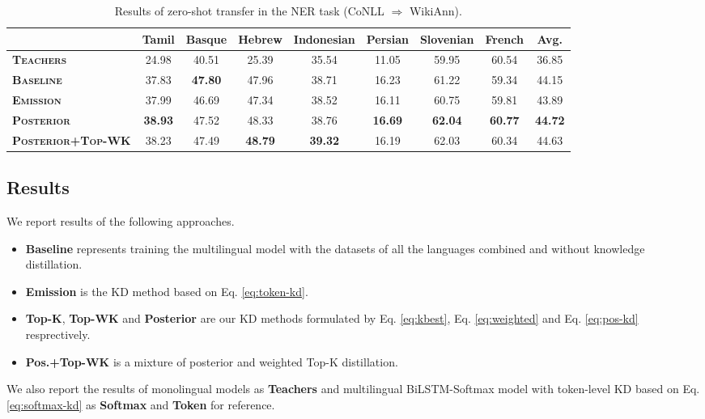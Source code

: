 \documentclass[11pt,a4paper]{article}
\begin{document}
\begin{table*}[ht]
\centering
\small
\begin{tabular}{l|ccccccc|c}
\hline\hline
 & \bf Tamil & \bf Basque    & \bf Hebrew    & \bf Indonesian & \bf Persian   & \bf Slovenian    & \bf French      & \bf Avg.   \\
\hline
\bf \textsc{Teachers}&          24.98&  40.51&  25.39&  35.54&  11.05&  59.95&  60.54&  36.85  \\
\bf \textsc{Baseline}         & 37.83 & \textbf{47.80} & 47.96 & 38.71 & 16.23 & 61.22 & 59.34 & 44.15 \\
\bf \textsc{Emission}        & 37.99 & 46.69 & 47.34 & 38.52 & 16.11 & 60.75 & 59.81 & 43.89 \\
\bf \textsc{Posterior}        & \textbf{38.93} & 47.52 & 48.33 & 38.76 & \textbf{16.69} & \textbf{62.04} & \textbf{60.77} & \textbf{44.72} \\
\bf \textsc{Posterior+Top-WK} & 38.23 & 47.49 & \textbf{48.79} & \textbf{39.32} & 16.19 & 62.03 & 60.34 & 44.63 \\
\hline\hline
\end{tabular}
\caption{Results of zero-shot transfer in the NER task (CoNLL $\Rightarrow$ WikiAnn).}
\label{tab:zeroshot}
\end{table*}

\subsection{Results}
\label{sec:result}
We report results of the following approaches.
\begin{itemize}
\item {\bf Baseline} represents training the multilingual model with the datasets of all the languages combined and without knowledge distillation.
    \item {\bf Emission} is the KD method based on Eq. \ref{eq:token-kd}.
    \item {\bf Top-K}, {\bf Top-WK} and {\bf Posterior} are our KD methods formulated by Eq. \ref{eq:kbest}, Eq. \ref{eq:weighted} and Eq. \ref{eq:pos-kd} resprectively. \item {\bf Pos.+Top-WK} is a mixture of posterior and weighted Top-K distillation.
\end{itemize}
We also report the results of monolingual models as {\bf Teachers} and multilingual BiLSTM-Softmax model with token-level KD based on Eq. \ref{eq:softmax-kd} as {\bf Softmax} and {\bf Token} for reference.
\end{document}
